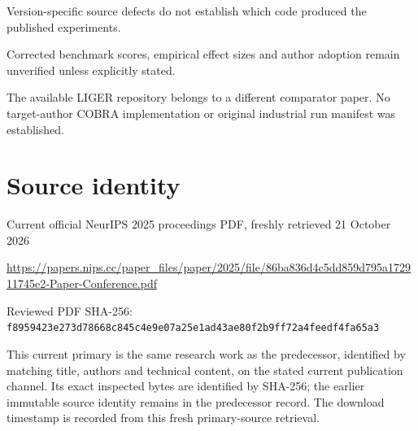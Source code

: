 \documentclass[11pt]{article}
\begin{document}
Version-specific source defects do not establish which code produced the published experiments.\par

Corrected benchmark scores, empirical effect sizes and author adoption remain unverified unless explicitly stated.\par

The available LIGER repository belongs to a different comparator paper. No target-author COBRA implementation or original industrial run manifest was established.\par

\section*{Source identity}

Current official NeurIPS 2025 proceedings PDF, freshly retrieved 21 October 2026

\url{https://papers.nips.cc/paper_files/paper/2025/file/86ba836d4c5dd859d795a172911745e2-Paper-Conference.pdf}

Reviewed PDF SHA-256: \nolinkurl{f8959423e273d78668c845c4e9e07a25e1ad43ae80f2b9ff72a4feedf4fa65a3}

This current primary is the same research work as the predecessor, identified by matching title, authors and technical content, on the stated current publication channel. Its exact inspected bytes are identified by SHA-256; the earlier immutable source identity remains in the predecessor record. The download timestamp is recorded from this fresh primary-source retrieval.
\end{document}
